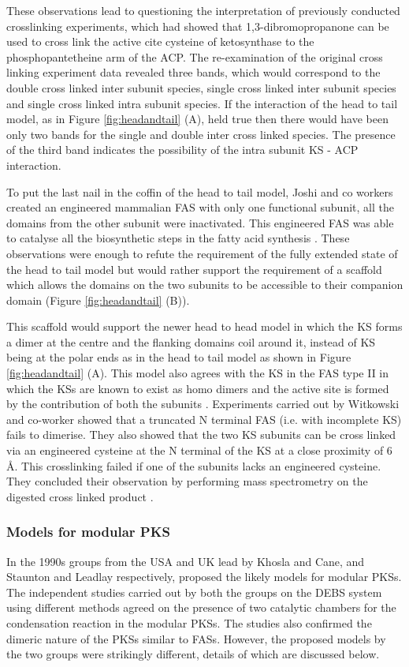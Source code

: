 		 	These observations lead to  questioning the interpretation of previously conducted crosslinking experiments, which had showed that 1,3-dibromopropanone can be used to cross link the active cite cysteine of ketosynthase to the phosphopantetheine arm of the ACP. The re-examination of the original cross linking experiment data revealed three bands, which would correspond to the double cross linked inter subunit species, single cross linked inter subunit species and single cross linked intra subunit species. If the interaction of the head to tail model, as in Figure \ref{fig:headandtail} (A), held true then there would have been only two bands for the single and double inter cross linked species. The presence of the third band indicates the possibility of the intra subunit KS - ACP interaction.
		 	
		 	To put the last nail in the coffin of the head to tail model, Joshi and co workers created an engineered mammalian FAS with only one functional subunit, all the domains from the other subunit were inactivated. This engineered FAS was able to catalyse all the biosynthetic steps in the fatty acid synthesis \parencite{Joshi2003}. These observations were enough to refute the requirement of the fully extended state of the head to tail model but would rather support the requirement of a scaffold which allows the domains on the two subunits to be accessible to their companion domain (Figure \ref{fig:headandtail} (B)).
		 	
 			This scaffold would support the newer head to head model in which the KS forms a dimer at the centre and the flanking domains coil around it, instead of KS being at the polar ends as in the head to tail model as  shown in Figure \ref{fig:headandtail} (A). This model also agrees with the KS in the FAS type II in which the KSs are known to exist as homo dimers and the active site is formed by the contribution of both the subunits \parencite{Moche1999, Olsen2001, Price2003}. Experiments carried out by Witkowski and co-worker showed that a truncated N terminal FAS (i.e. with incomplete KS) fails to dimerise. They also showed that the two KS subunits can be  cross linked via an engineered cysteine at the N terminal of the KS at a close proximity of 6 \AA{}. This crosslinking failed if one of the subunits lacks an engineered cysteine. They concluded their observation by performing mass spectrometry on the digested  cross linked product \parencite{Witkowski2004}.
 			
 			\subsubsection{Models for modular PKS}
 			\label{sec:CamPKS}
 			In the 1990s groups from the USA and UK lead by Khosla and Cane, and Staunton and Leadlay respectively, proposed the likely models for modular PKSs. The independent studies carried out by both the groups on the DEBS system using different methods agreed on the presence of two catalytic chambers for the condensation reaction in the modular PKSs. The studies also confirmed the dimeric nature of the PKSs similar to FASs. However, the proposed models by the two groups were strikingly different, details of which are discussed below. 
 			
